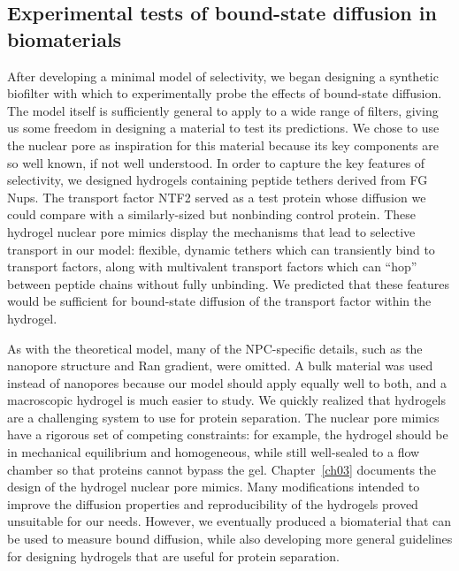 \subsection{Experimental tests of bound-state diffusion in biomaterials}

After developing a minimal model of selectivity, we began designing a synthetic biofilter with which to experimentally probe the effects of bound-state diffusion.  The model itself is sufficiently general to apply to a wide range of filters, giving us some freedom in designing a material to test its predictions.  We chose to use the nuclear pore as inspiration for this material because its key components are so well known, if not well understood.  In order to capture the key features of selectivity, we designed hydrogels containing peptide tethers derived from FG Nups.  The transport factor NTF2 served as a test protein whose diffusion we could compare with a similarly-sized but nonbinding control protein.  These hydrogel nuclear pore mimics display the mechanisms that lead to selective transport in our model: flexible, dynamic tethers which can transiently bind to transport factors, along with multivalent transport factors which can ``hop'' between peptide chains without fully unbinding.  We predicted that these features would be sufficient for bound-state diffusion of the transport factor within the hydrogel.

As with the theoretical model, many of the NPC-specific details, such as the nanopore structure and Ran gradient, were omitted.  A bulk material was used instead of nanopores because our model should apply equally well to both, and a macroscopic hydrogel is much easier to study.  We quickly realized that hydrogels are a challenging system to use for protein separation.  The nuclear pore mimics have a rigorous set of competing constraints: for example, the hydrogel should be in mechanical equilibrium and homogeneous, while still well-sealed to a flow chamber so that proteins cannot bypass the gel.  Chapter~\ref{ch03} documents the design of the hydrogel nuclear pore mimics.  Many modifications intended to improve the diffusion properties and reproducibility of the hydrogels proved unsuitable for our needs.  However, we eventually produced a biomaterial that can be used to measure bound diffusion, while also developing more general guidelines for designing hydrogels that are useful for protein separation.

